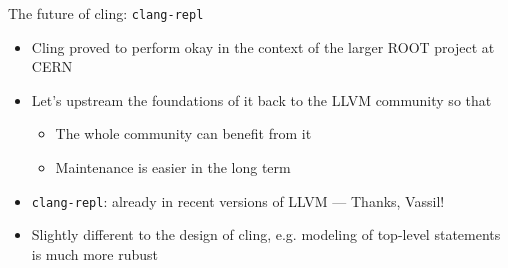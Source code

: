 \begin{frame}{The future of cling: \protect\texttt{clang-repl}}
  \begin{itemize}
    \itemsep=1ex

  \item Cling proved to perform okay in the context of the larger ROOT project at CERN

  \item Let's upstream the foundations of it back to the LLVM community so that
    \begin{itemize}
    \item The whole community can benefit from it
    \item Maintenance is easier in the long term
    \end{itemize}

  \item \texttt{clang-repl}: already in recent versions of LLVM --- \alert{Thanks, Vassil!}

  \item Slightly different to the design of cling, e.g. modeling of top-level statements is much more rubust
  \end{itemize}
\end{frame}
